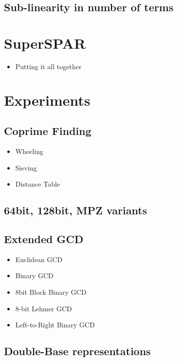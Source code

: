 \documentclass[11pt, letterpaper]{article}
\theoremstyle{definition}
\begin{document}
\subsection{Sub-linearity in number of terms}

\bigbreak
\section{SuperSPAR}
\begin{itemize}
\item Putting it all together
\end{itemize}

\bigbreak
\section{Experiments}

\subsection{Coprime Finding}
\begin{itemize}
\item Wheeling
\item Sieving
\item Distance Table
\end{itemize}

\subsection{64bit, 128bit, MPZ variants}

\subsection{Extended GCD}
\begin{itemize}
\item Euclidean GCD
\item Binary GCD
\item 8bit Block Binary GCD
\item 8-bit Lehmer GCD
\item Left-to-Right Binary GCD
\end{itemize}

\subsection{Double-Base representations}
\end{document}
